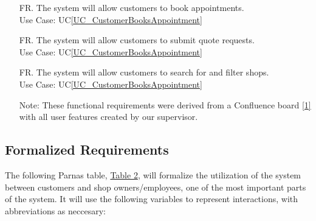 \documentclass[12pt]{article}
\newcounter{reqnum} %
\begin{document}
\begin{itemize}
\item[FR\refstepcounter{reqnum}\thereqnum \label{R_BookAppointment}.] The system will allow customers to book appointments.\\
Use Case: UC\ref{UC_CustomerBooksAppointment}

\item[FR\refstepcounter{reqnum}\thereqnum \label{R_SubmitQuoteRequests}.] The system will allow customers to submit quote requests.\\
Use Case: UC\ref{UC_CustomerBooksAppointment}

\item[FR\refstepcounter{reqnum}\thereqnum \label{R_SearchShop}.] The system will allow customers to search for and filter shops.\\
Use Case: UC\ref{UC_CustomerBooksAppointment}

Note: These functional requirements were derived from a Confluence board \hyperref[1]{[1]} with all user features created by our supervisor.

\end{itemize}

\subsection{Formalized Requirements}

The following Parnas table, \hyperref[tab:formal]{Table 2}, will formalize the utilization of the system between customers and shop owners/employees, one of the most important parts of the system. It will use the following variables to represent interactions, with abbreviations as neccesary:
\end{document}
